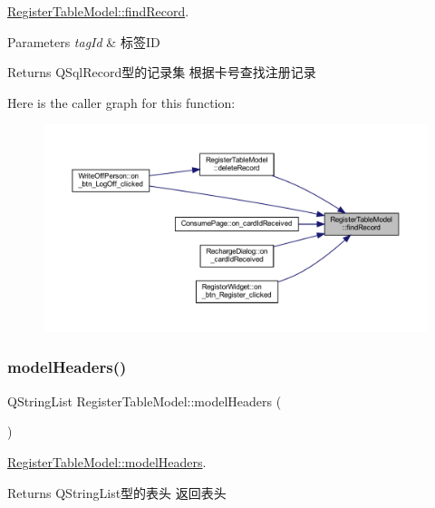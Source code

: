 \mbox{\hyperlink{class_register_table_model_a5d54272261bd8aaae74929fa468b0271}{Register\+Table\+Model\+::find\+Record}}. 


\begin{DoxyParams}{Parameters}
{\em tag\+Id} & 标签\+ID \\
\hline
\end{DoxyParams}
\begin{DoxyReturn}{Returns}
Q\+Sql\+Record型的记录集 根据卡号查找注册记录 
\end{DoxyReturn}
Here is the caller graph for this function\+:
\nopagebreak
\begin{figure}[H]
\begin{center}
\leavevmode
\includegraphics[width=350pt]{class_register_table_model_a5d54272261bd8aaae74929fa468b0271_icgraph}
\end{center}
\end{figure}
\mbox{\label{class_register_table_model_a12492b122b9be5da5694e2c82a2d8d10}} 
\subsubsection{\texorpdfstring{modelHeaders()}{modelHeaders()}}
{\footnotesize\ttfamily Q\+String\+List Register\+Table\+Model\+::model\+Headers (\begin{DoxyParamCaption}{ }\end{DoxyParamCaption})}



\mbox{\hyperlink{class_register_table_model_a12492b122b9be5da5694e2c82a2d8d10}{Register\+Table\+Model\+::model\+Headers}}. 

\begin{DoxyReturn}{Returns}
Q\+String\+List型的表头 返回表头 
\end{DoxyReturn}



